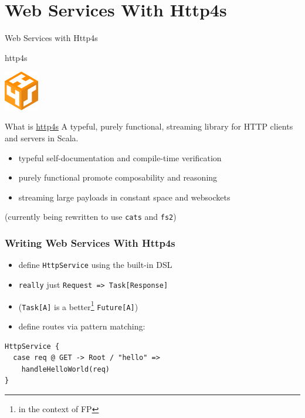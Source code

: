 \documentclass{beamer}
\begin{document}
\section{Web Services With Http4s}

\begin{frame}
  \begin{center}
    \Huge Web Services with Http4s
  \end{center}
\end{frame}

\begin{frame}{http4s}
  \begin{center}
    \includegraphics[width=15mm]{../pics/http4s.png}
  \end{center}

  \begin{block}{What is \hyperlink{http://http4s.org/}{http4s}}
    A typeful, purely functional, streaming library for HTTP
    clients and servers in Scala.
  \end{block}
  \begin{itemize}
  \item typeful \textemdash{} self-documentation and compile-time verification
  \item purely functional \textemdash{} promote composability and reasoning
  \item streaming \textemdash{} large payloads in constant space and
    websockets
  \end{itemize}
  \begin{center}
    \alert{(currently being rewritten to use \texttt{cats} and \texttt{fs2})}
  \end{center}

\end{frame}

\begin{frame}[fragile]
  \frametitle{Writing Web Services With Http4s}
  \begin{itemize}
  \item define \texttt{HttpService} using the built-in DSL
  \item \texttt{really} just \texttt{Request => Task[Response]}
  \item (\texttt{Task[A]} is a better\footnote{in the context of FP} \texttt{Future[A]})
  \item define routes via pattern matching:
  \end{itemize}
\begin{verbatim}
HttpService {
  case req @ GET -> Root / "hello" =>
    handleHelloWorld(req)
}
\end{verbatim}
\end{frame}
\end{document}
